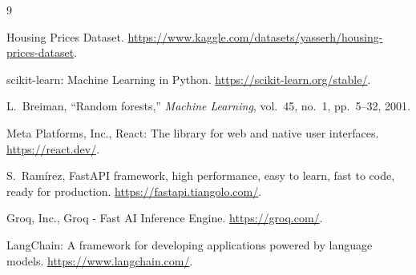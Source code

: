 \documentclass[conference]{IEEEtran}
\begin{document}
\begin{thebibliography}{9}

Housing Prices Dataset. \url{https://www.kaggle.com/datasets/yasserh/housing-prices-dataset}.

scikit-learn: Machine Learning in Python. \url{https://scikit-learn.org/stable/}.

L.~Breiman, ``Random forests,'' \emph{Machine Learning}, vol.~45, no.~1, pp.~5--32, 2001.

Meta Platforms, Inc., React: The library for web and native user interfaces. \url{https://react.dev/}.

S.~Ram{\'i}rez, FastAPI framework, high performance, easy to learn, fast to code, ready for production. \url{https://fastapi.tiangolo.com/}.

Groq, Inc., Groq - Fast AI Inference Engine. \url{https://groq.com/}.

LangChain: A framework for developing applications powered by language models. \url{https://www.langchain.com/}.

\end{thebibliography}
\end{document}
